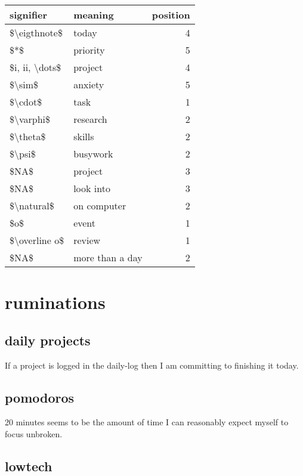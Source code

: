 \documentclass[]{book}
\begin{document}
\begin{tabular}{l|l|r}
\hline
signifier & meaning & position\\
\hline
\$\textbackslash{}eigthnote\$ & today & 4\\
\hline
\$*\$ & priority & 5\\
\hline
\$i, ii, \textbackslash{}dots\$ & project & 4\\
\hline
\$\textbackslash{}sim\$ & anxiety & 5\\
\hline
\$\textbackslash{}cdot\$ & task & 1\\
\hline
\$\textbackslash{}varphi\$ & research & 2\\
\hline
\$\textbackslash{}theta\$ & skills & 2\\
\hline
\$\textbackslash{}psi\$ & busywork & 2\\
\hline
\$NA\$ & project & 3\\
\hline
\$NA\$ & look into & 3\\
\hline
\$\textbackslash{}natural\$ & on computer & 2\\
\hline
\$o\$ & event & 1\\
\hline
\$\textbackslash{}overline o\$ & review & 1\\
\hline
\$NA\$ & more than a day & 2\\
\hline
\end{tabular}

\hypertarget{ruminations}{%
\chapter{ruminations}\label{ruminations}}

\hypertarget{daily-projects}{%
\section{daily projects}\label{daily-projects}}

If a project is logged in the \protect\hypertarget{daily-log}{}{daily-log} then I am committing to finishing it today.

\hypertarget{pomodoros}{%
\section{pomodoros}\label{pomodoros}}

20 minutes seems to be the amount of time I can reasonably expect myself to focus unbroken.

\hypertarget{lowtech}{%
\section{lowtech}\label{lowtech}}
\end{document}
